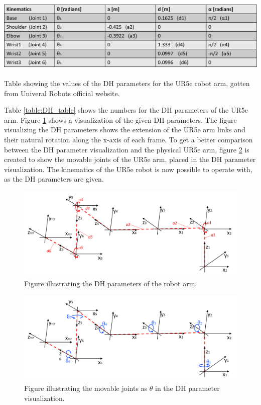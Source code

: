 \begin{table}[ht]
    \centering
    \includegraphics[width=15cm]{img/DH_param_list.png}
    \caption{Table showing the values of the DH parameters for the UR5e robot arm, gotten from Univeral Robots official website.}
    \label{table:DH_table}
\end{table}
Table \ref{table:DH_table} shows the numbers for the DH parameters of the UR5e arm. Figure \ref{fig:DH_UR53} shows a visualization of the given DH parameters. The figure visualizing the DH parameters shows the extension of the UR5e arm links and their natural rotation along the x-axis of each frame. To get a better comparison between the DH parameter visualization and the physical UR5e arm, figure \ref{fig:DH_UR53_theta} is created to show the movable joints of the UR5e arm, placed in the DH parameter visualization. The kinematics of the UR5e robot is now possible to operate with, as the DH parameters are given.
\begin{figure}[ht]
    \centering
    \includegraphics[width=15cm]{img/Wild_DH_parameters.png}
    \caption{Figure illustrating the DH parameters of the robot arm.}
    \label{fig:DH_UR53}
\end{figure}

\begin{figure}[ht]
    \centering
    \includegraphics[width=15cm]{img/DH_viz_theta.png}
    \caption{Figure illustrating the movable joints as $\theta$ in the DH parameter visualization.}
    \label{fig:DH_UR53_theta}
\end{figure}

